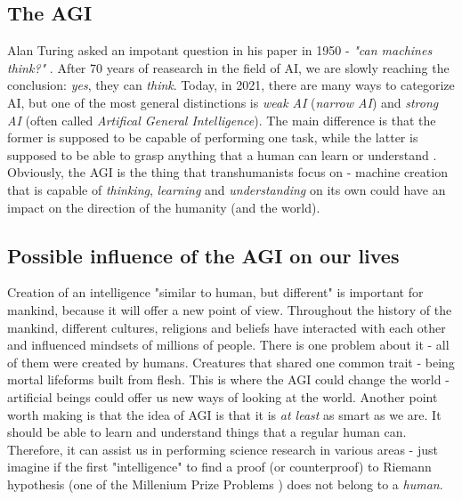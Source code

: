 \documentclass[12pt]{article}
\begin{document}
\subsection{The AGI}
	Alan Turing asked an impotant question in his paper in 1950 - \emph{"can machines think?"} \cite{turing}. After 70 years of reasearch in the field of AI, we are slowly reaching the conclusion: \emph{yes}, they can \emph{think}. Today, in 2021, there are many ways to categorize AI, but one of the most general distinctions is \emph{weak AI} (\emph{narrow AI}) and \emph{strong AI} (often called \emph{Artifical General Intelligence}). The main difference is that the former is supposed to be capable of performing one task, while the latter is supposed to be able to grasp anything that a human can learn or understand \cite{wikipediaAgi}. Obviously, the AGI is the thing that transhumanists focus on - machine creation that is capable of \emph{thinking}, \emph{learning} and \emph{understanding} on its own could have an impact on the direction of the humanity (and the world).

\subsection{Possible influence of the AGI on our lives}
	Creation of an intelligence "similar to human, but different" is important for mankind, because it will offer a new point of view. Throughout the history of the mankind, different cultures, religions and beliefs have interacted with each other and influenced mindsets of millions of people. There is one problem about it - all of them were created by humans. Creatures that shared one common trait - being mortal lifeforms built from flesh. This is where the AGI could change the world - artificial beings could offer us new ways of looking at the world. Another point worth making is that the idea of AGI is that it is \emph{at least} as smart as we are. It should be able to learn and understand things that a regular human can. Therefore, it can assist us in performing science research in various areas - just imagine if the first "intelligence" to find a proof (or counterproof) to Riemann hypothesis (one of the Millenium Prize Problems \cite{wiki:riemann}) does not belong to a \emph{human}.
\end{document}
